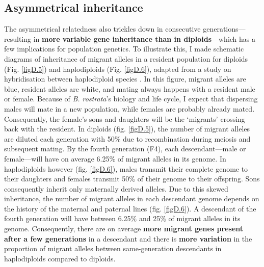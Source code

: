 \documentclass[10pt, twoside]{book} %
\begin{document}
	\subsection{Asymmetrical inheritance}\label{asymminh}
	The asymmetrical relatedness also trickles down in consecutive generations---resulting in \textbf{more variable gene inheritance than in diploids}---which has a few implications for population genetics. To illustrate this, I made schematic diagrams of inheritance of migrant alleles in a resident population for diploids (Fig. \ref{figD.5}) and haplodiploids (Fig. \ref{figD.6}), adapted from a study on hybridisation between haplodiploid species \citep{patten2015}. In this figure, migrant alleles are blue, resident alleles are white, and mating always happens with a resident male or female. Because of \textit{B. rostrata}'s biology and life cycle, I expect that dispersing males will mate in a new population, while females are probably already mated. Consequently, the female's sons and daughters will be the `migrants' crossing back with the resident. In diploids (fig. \ref{figD.5}), the number of migrant alleles are diluted each generation with 50$\%$ due to recombination during meiosis and subsequent mating. By the fourth generation (F4), each descendant---male or female---will have on average 6.25$\%$ of migrant alleles in its genome. In haplodiploids however (fig. \ref{figD.6}), males transmit their complete genome to their daughters and females transmit 50$\%$ of their genome to their offspring. Sons consequently inherit only maternally derived alleles. Due to this skewed inheritance, the number of migrant alleles in each descendant genome depends on the history of the maternal and paternal lines (fig. \ref{figD.6}). A descendant of the fourth generation will have between 6.25$\%$ and 25$\%$ of migrant alleles in its genome. Consequently, there are on average \textbf{more migrant genes present after a few generations} in a descendant and there is \textbf{more variation} in the proportion of migrant alleles between same-generation descendants in haplodiploids compared to diploids.\\
	
\end{document}
